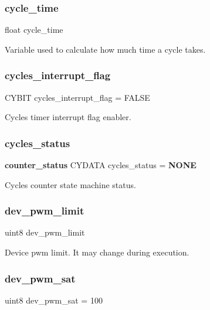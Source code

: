 \subsubsection{cycle\+\_\+time}
{\footnotesize\ttfamily float cycle\+\_\+time}

Variable used to calculate how much time a cycle takes. \mbox{\label{globals_8c_a9c58c534e60c7991a92a13d012e7ef86}} 
\subsubsection{cycles\+\_\+interrupt\+\_\+flag}
{\footnotesize\ttfamily C\+Y\+B\+IT cycles\+\_\+interrupt\+\_\+flag = F\+A\+L\+SE}

Cycles timer interrupt flag enabler. \mbox{\label{globals_8c_a9087b28d15f17c6475922ba6943b14f3}} 
\subsubsection{cycles\+\_\+status}
{\footnotesize\ttfamily \textbf{ counter\+\_\+status} C\+Y\+D\+A\+TA cycles\+\_\+status = \textbf{ N\+O\+NE}}

Cycles counter state machine status. \mbox{\label{globals_8c_a21f4f67e4203dea0b9956589eaa6cef3}} 
\subsubsection{dev\+\_\+pwm\+\_\+limit}
{\footnotesize\ttfamily uint8 dev\+\_\+pwm\+\_\+limit}

Device pwm limit. It may change during execution. \mbox{\label{globals_8c_ad5c7a08c9d0e804a0db2d6f169976a13}} 
\subsubsection{dev\+\_\+pwm\+\_\+sat}
{\footnotesize\ttfamily uint8 dev\+\_\+pwm\+\_\+sat = 100}

